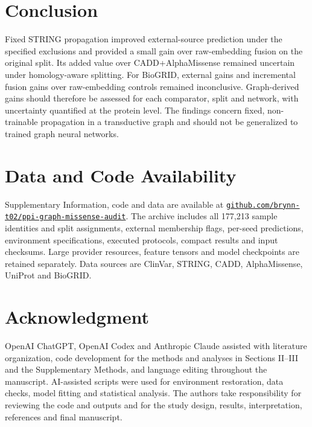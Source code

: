 \documentclass[conference]{IEEEtran}
\begin{document}
\section{Conclusion}
Fixed STRING propagation improved external-source prediction under the specified exclusions and provided a small gain over raw-embedding fusion on the original split. Its added value over CADD+AlphaMissense remained uncertain under homology-aware splitting. For BioGRID, external gains and incremental fusion gains over raw-embedding controls remained inconclusive. Graph-derived gains should therefore be assessed for each comparator, split and network, with uncertainty quantified at the protein level. The findings concern fixed, non-trainable propagation in a transductive graph and should not be generalized to trained graph neural networks.

\section*{Data and Code Availability}

Supplementary Information, code and data are available at \href{https://github.com/brynn-t02/ppi-graph-missense-audit}{\nolinkurl{github.com/brynn-t02/ppi-graph-missense-audit}}. The archive includes all 177,213 sample identities and split assignments, external membership flags, per-seed predictions, environment specifications, executed protocols, compact results and input checksums. Large provider resources, feature tensors and model checkpoints are retained separately. Data sources are ClinVar, STRING, CADD, AlphaMissense, UniProt and BioGRID.

\section*{Acknowledgment}

OpenAI ChatGPT, OpenAI Codex and Anthropic Claude assisted with literature organization, code development for the methods and analyses in Sections II--III and the Supplementary Methods, and language editing throughout the manuscript. AI-assisted scripts were used for environment restoration, data checks, model fitting and statistical analysis. The authors take responsibility for reviewing the code and outputs and for the study design, results, interpretation, references and final manuscript.
\end{document}
